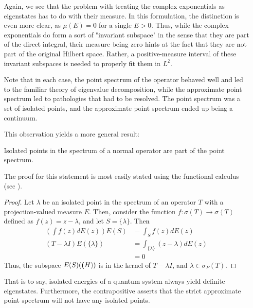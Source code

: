 Again, we see that the problem with treating the complex exponentials as
eigenstates has to do with their measure. In this formulation, the distinction
is even more clear, as $\mu(E)=0$ for a single $E>0$. Thus, while the complex
exponentials do form a sort of "invariant subspace" in the sense that they are
part of the direct integral, their measure being zero hints at the fact that
they are not part of the original Hilbert space. Rather, a positive-measure
interval of these invariant subspaces is needed to properly fit them in $L^2$.

Note that in each case, the point spectrum of the operator behaved well and led
to the familiar theory of eigenvalue decomposition, while the approximate point
spectrum led to pathologies that had to be resolved. The point spectrum was a
set of isolated points, and the approximate point spectrum ended up being a
continuum.

This observation yields a more general result:
\begin{theorem}
    Isolated points in the spectrum of a normal operator are part of the point
    spectrum.
\end{theorem}
The proof for this statement is most easily stated using the functional calculus
(see \cite[p. 140-143]{MacCluer2009}).
\begin{proof}
    Let $\lambda$ be an isolated point in the spectrum of an operator $T$ with a
    projection-valued measure $E$. Then,
    consider the function $f:\sigma(T)\to\sigma(T)$ defined as $f(z) =
    z-\lambda$, and let $S=\{\lambda\}$. Then
    \[
        \begin{aligned}
            \left(\int f(z)dE(z)\right) E(S) &= \int_S f(z)dE(z)\\
            (T-\lambda I)E(\{\lambda\}) &= \int_{\{\lambda\}}(z-\lambda)dE(z)\\
                                        &= 0
        \end{aligned}
    \]
    Thus, the subspace $E(S)(\textbf(H))$ is in the kernel of $T-\lambda I$, and
    $\lambda\in\sigma_P(T)$.
\end{proof}

That is to say, isolated energies of a quantum system always yield definite
eigenstates. Furthermore, the contrapositive asserts that the strict approximate
point spectrum will not have any isolated points.
